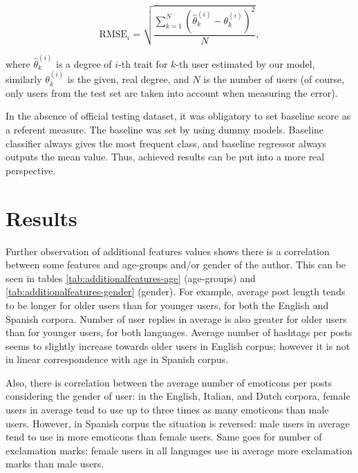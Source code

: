 \documentclass[10pt, a4paper]{article}
\begin{document}
\[\mathrm{RMSE}_i=\sqrt{\frac{\sum_{k = 1}^{N}\left(\hat{\theta}_{k}^{(i)} - \theta_{k}^{(i)}\right)^2}{N}},\]

\noindent where $\hat{\theta}_k^{(i)}$ is a degree of $i$-th trait for $k$-th user estimated by our model, similarly $\theta_k^{(i)}$ is the given, real degree, and $N$ is the number of users (of course, only users from the test set are taken into account when measuring the error).

In the absence of official testing dataset, it was obligatory to set baseline score as a referent measure.
The baseline was set by using dummy models.
Baseline classifier always gives the most frequent class, and baseline regressor always outputs the mean value.
Thus, achieved results can be put into a more real perspective.

\section{Results}
\label{sec:results}

Further observation of additional features values shows there is a correlation between some features and age-groups and/or gender of the author.
This can be seen in tables \ref{tab:additionalfeatures-age} (age-groups) and \ref{tab:additionalfeatures-gender} (gender).
For example, average post length tends to be longer for older users than for younger users, for both the English and Spanish corpora.
Number of user replies in average is also greater for older users than for younger users, for both languages.
Average number of hashtags per posts seems to slightly increase towards older users in English corpus; however it is not in linear correspondence with age in Spanish corpus.

Also, there is correlation between the average number of emoticons per posts considering the gender of user: in the English, Italian, and Dutch corpora, female users in average tend to use up to three times as many emoticons than male users.
However, in Spanish corpus the situation is reversed: male users in average tend to use in more emoticons than female users.
Same goes for number of exclamation marks: female users in all languages use in average more exclamation marks than male users.

\end{document}

